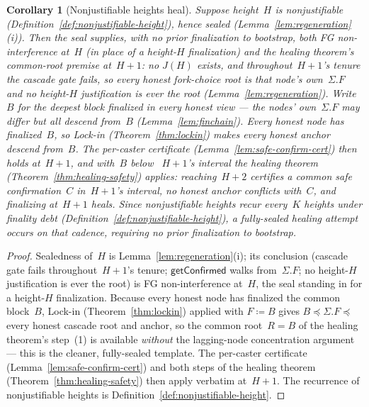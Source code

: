 \ifx\litemode\undefined\documentclass{article}\fi
\newcommand{\getConfirmed}{\textsf{getConfirmed}\xspace}
\newcommand{\Knj}{\ensuremath{K}}                      %
\theoremstyle{plain}
\newtheorem{corollary}{Corollary}
\theoremstyle{definition}
\theoremstyle{remark}
\begin{document}
\begin{corollary}[Nonjustifiable heights heal]\label{cor:nonjustifiable-heal}
Suppose height~\(H\) is nonjustifiable (Definition~\ref{def:nonjustifiable-height}),
hence sealed (Lemma~\ref{lem:regeneration}(i)).  Then the seal supplies, with no
prior finalization to bootstrap, both FG non-interference at~\(H\) (in place of a
height-\(H\) finalization) and the healing theorem's common-root premise
at~\(H+1\): no \(J(H)\) exists, and throughout~\(H+1\)'s tenure the cascade gate
fails, so
every honest fork-choice root is that node's own~\(\Sigma.F\) and no
height-\(H\) justification is ever the root (Lemma~\ref{lem:regeneration}).  Write
\(B\) for the \emph{deepest block finalized in every honest view} --- the nodes'
own~\(\Sigma.F\) may differ but all descend from~\(B\) (Lemma~\ref{lem:finchain}).
Every honest node has finalized~\(B\), so Lock-in (Theorem~\ref{thm:lockin}) makes
every honest anchor descend from~\(B\).  The per-caster certificate
(Lemma~\ref{lem:safe-confirm-cert}) then holds at~\(H+1\), and with~\(B\) below
~\(H+1\)'s interval the healing theorem (Theorem~\ref{thm:healing-safety})
applies: reaching~\(H+2\) certifies a common safe confirmation~\(C\) in~\(H+1\)'s
interval, no honest anchor conflicts with~\(C\), and finalizing at~\(H+1\) heals.
Since nonjustifiable heights recur every~\(\Knj\) heights under finality debt
(Definition~\ref{def:nonjustifiable-height}), a fully-sealed healing attempt
occurs on that cadence, requiring no prior finalization to bootstrap.
\end{corollary}

\begin{proof}
Sealedness of~\(H\) is Lemma~\ref{lem:regeneration}(i); its conclusion (cascade
gate fails throughout~\(H+1\)'s tenure; \(\getConfirmed\) walks from~\(\Sigma.F\);
no height-\(H\) justification is ever the root) is FG non-interference at~\(H\),
the seal standing in for a height-\(H\) finalization.  Because every honest node
has finalized the common
block~\(B\), Lock-in (Theorem~\ref{thm:lockin}) applied with \(F \coloneqq B\)
gives \(B \preceq \Sigma.F \preceq\) every honest cascade root and anchor, so the
common root~\(R = B\) of the healing theorem's step~(1) is available
\emph{without} the lagging-node concentration argument --- this is the cleaner,
fully-sealed template.  The per-caster certificate
(Lemma~\ref{lem:safe-confirm-cert}) and both steps of the healing theorem
(Theorem~\ref{thm:healing-safety}) then apply verbatim at~\(H+1\).  The
recurrence of nonjustifiable heights is
Definition~\ref{def:nonjustifiable-height}.
\end{proof}
\end{document}
